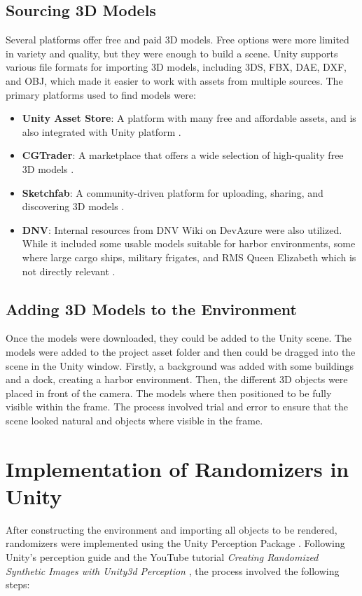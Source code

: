 \subsection{Sourcing 3D Models}
Several platforms offer free and paid 3D models. Free options were more limited in variety and quality, but they were enough to build a scene. Unity supports various file formats for importing 3D models, including 3DS, FBX, DAE, DXF, and OBJ, which made it easier to work with assets from multiple sources. The primary platforms used to find models were:
\begin{itemize}
\item \textbf{Unity Asset Store}: A platform with many free and affordable assets, and is also integrated with Unity platform \cite{UnityAssetStore}.
\item \textbf{CGTrader}: A marketplace that offers a wide selection of high-quality free 3D models \cite{cgtrader}.
\item \textbf{Sketchfab}: A community-driven platform for uploading, sharing, and discovering 3D models \cite{sketchfab}.
\item \textbf{DNV}: Internal resources from DNV Wiki on DevAzure were also utilized. While it included some usable models suitable for harbor environments, some where large cargo ships, military frigates, and RMS Queen Elizabeth which is not directly relevant \cite{dnv_wiki}.

\end{itemize}

\subsection{Adding 3D Models to the Environment}
Once the models were downloaded, they could be added to the Unity scene. The models were added to the project asset folder and then could be dragged into the scene in the Unity window. Firstly, a background was added with some buildings and a dock, creating a harbor environment. Then, the different 3D objects were placed in front of the camera. The models where then positioned to be fully visible within the frame. The process involved trial and error to ensure that the scene looked natural and objects where visible in the frame.


\section{Implementation of Randomizers in Unity}
After constructing the environment and importing all objects to be rendered, randomizers were implemented using the Unity Perception Package \cite{unity-perception2022}. Following Unity's perception guide \cite{unity-perception2022} and the YouTube tutorial \textit{Creating Randomized Synthetic Images with Unity3d Perception} \cite{secrets_of_apagayo_island_video}, the process involved the following steps:

